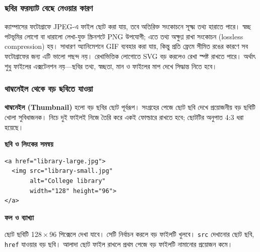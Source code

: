 \subsubsection{ছবির ফরম্যাট বেছে নেওয়ার কারণ}
ক্যাম্পাসের ফটোগ্রাফে JPEG-এ ফাইল ছোট করা যায়, তবে অতিরিক্ত সংকোচনে সূক্ষ্ম তথ্য হারাতে পারে। স্বচ্ছ পটভূমির লোগো বা ধারালো লেখা-যুক্ত স্ক্রিনশটে PNG উপযোগী; এতে তথ্য অক্ষুণ্ণ রাখা সংকোচন (lossless compression) হয়। সাধারণ অ্যানিমেশনে GIF ব্যবহার করা যায়, কিন্তু প্রতি ফ্রেমে সীমিত রঙের কারণে সব ফটোগ্রাফের জন্য এটি ভালো পছন্দ নয়। রেখাভিত্তিক লোগোতে SVG বড় করলেও রেখা স্পষ্ট রাখতে পারে। অর্থাৎ শুধু ফাইলের এক্সটেনশন নয়—ছবির তথ্য, স্বচ্ছতা, মান ও ফাইলের মাপ দেখে সিদ্ধান্ত নিতে হবে।

\subsubsection{থাম্বনেইল থেকে বড় ছবিতে যাওয়া}
\textbf{থাম্বনেইল (Thumbnail)} হলো বড় ছবির ছোট পূর্বরূপ। সংগ্রহের পেজে ছোট ছবি দেখে প্রয়োজনীয় বড় ছবিটি খোলা সুবিধাজনক। নিচে দুই ফাইলই নিজে তৈরি করে একই ফোল্ডারে রাখতে হবে; ছোটটির অনুপাত 4:3 ধরা হয়েছে।
\par\noindent\begin{minipage}[t]{.50\linewidth}\vspace{0pt}\small
\textbf{\color{chFourTeal}ছবি ও লিংকের সমন্বয়}\par
\begin{verbatim}
<a href="library-large.jpg">
  <img src="library-small.jpg"
       alt="College library"
       width="128" height="96">
</a>
\end{verbatim}
\end{minipage}\hfill
\begin{minipage}[t]{.46\linewidth}\vspace{0pt}\small
\textbf{\color{chFourTeal}ফল ও ব্যাখ্যা}\par
ছোট ছবিটি 128\,$\times$\,96 পিক্সেলে দেখা যাবে। সেটি নির্বাচন করলে বড় ফাইলটি খুলবে। \texttt{src} দেখানোর ছোট ছবি, \texttt{href} যাওয়ার বড় ছবি। আলাদা ছোট ফাইল রাখলে প্রথম পেজে বড় ফাইলটি নামানোর প্রয়োজন কমে।
\end{minipage}\par

